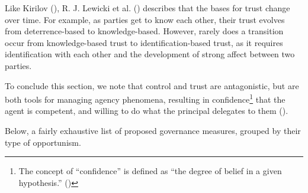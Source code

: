 \documentclass[
  man,floatsintext]{apa6}
\begin{document}
Like Kirilov (), R. J. Lewicki et al. () describes that the bases for trust change over time. For example, as parties get to know each other, their trust evolves from deterrence-based to knowledge-based. However, rarely does a transition occur from knowledge-based trust to identification-based trust, as it requires identification with each other and the development of strong affect between two parties.

To conclude this section, we note that control and trust are antagonistic, but are both tools for managing agency phenomena, resulting in confidence\footnote{The concept of ``confidence'' is defined as ``the degree of belief in a given hypothesis.'' ()} that the agent is competent, and willing to do what the principal delegates to them ().

Below, a fairly exhaustive list of proposed governance measures, grouped by their type of opportunism.
\end{document}
